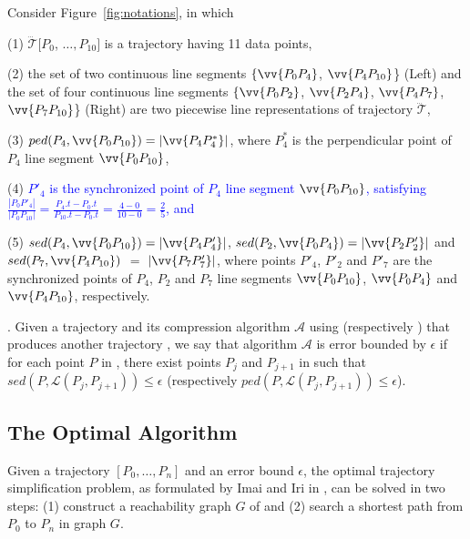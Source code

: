 \begin{example}
\label{exm-notations}
Consider Figure~\ref{fig:notations}, in which

\sstab(1) $\dddot{\mathcal{T}}[P_0$, $\ldots, P_{10}]$ is a trajectory having 11 data points,

\sstab(2) the set of two continuous line segments $\{\vv{P_0P_4}$, $\vv{P_4P_{10}}$\} (Left) and the set of four continuous line segments $\{\vv{P_0P_2}$, $\vv{P_2P_4}$, $\vv{P_4P_7}$, $\vv{P_7P_{10}}$\} (Right) are two piecewise line representations of trajectory $\dddot{\mathcal{T}}$,

\sstab(3) $ped(P_4, \vv{P_0P_{10}})=|\vv{P_4P^*_4}|$, where $P^*_4$ is the perpendicular point of $P_4$ \wrt line segment $\vv{P_0P_{10}}$, 

\sstab(4) \textcolor{blue}{$P'_4$ is the synchronized point of $P_4$ \wrt line segment $\vv{P_0P_{10}}$, satisfying $\frac{|P_0P'_4|}{|P_0P_{10}|} = \frac{P_4.t - P_0.t}{P_{10}.t-P_0.t} = \frac{4-0}{10-0}= \frac{2}{5}$, and}

\sstab(5) $sed(P_4, \vv{P_0P_{10}})= |\vv{P_4P'_4}|$, $sed(P_2, \vv{P_0P_{4}})= |\vv{P_2P'_2}|$ and $sed(P_7, \vv{P_4P_{10}})$ $=$ $|\vv{P_7P'_7}|$,
where points $P'_4$, $P'_2$ and $P'_7$ are the synchronized points of $P_4$, $P_2$ and $P_7$ \wrt line segments $\vv{P_0P_{10}}$, $\vv{P_0P_{4}}$ and $\vv{P_4P_{10}}$, respectively. \eop
\end{example}

. Given a trajectory  and its compression  algorithm $\mathcal{A}$ using \sed (respectively \ped) that produces another trajectory ,
we say that algorithm $\mathcal{A}$ is error bounded by $\epsilon$ if  for each point $P$ in , there exist points $P_j$ and $P_{j+1}$ in  such that $sed(P, \mathcal{L}(P_j,P_{j+1}))\le \epsilon$ (respectively $ped(P, \mathcal{L}(P_j,P_{j+1}))\le \epsilon$).



\subsection{The Optimal \lsa Algorithm}
\label{subsec-optimal}

Given a trajectory ${[P_0, \ldots, P_n]}$ and an error bound $\epsilon$, the optimal trajectory simplification problem, as formulated by Imai and Iri in \cite{Imai:Optimal}, can be solved in two steps: (1) construct a reachability graph $G$ of  and (2) search a shortest path from $P_0$ to $P_{n}$ in graph $G$.

